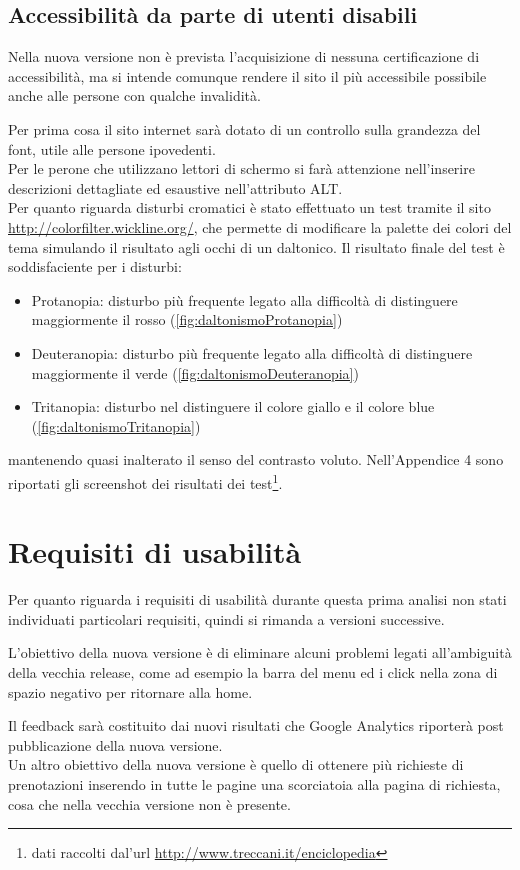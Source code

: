 \documentclass[a4paper,12pt,hidelinks]{report}
\begin{document}
  \subsection{Accessibilità da parte di utenti disabili}
    Nella nuova versione non è prevista l'acquisizione di nessuna certificazione di accessibilità, ma si intende comunque rendere il sito il 
    più accessibile possibile anche alle persone con qualche invalidità.
    \par Per prima cosa il sito internet sarà dotato di un controllo sulla grandezza del font, utile alle persone ipovedenti. 
    \\ Per le perone che utilizzano lettori di schermo si farà attenzione nell'inserire descrizioni dettagliate ed esaustive nell'attributo ALT.
    \\ Per quanto riguarda disturbi cromatici è stato effettuato un test tramite il sito \url{http://colorfilter.wickline.org/}, che permette di modificare 
    la palette dei colori del tema simulando il risultato agli occhi di un daltonico. 
    Il risultato finale del test è soddisfaciente per i disturbi:
    \begin{itemize}
      \item Protanopia: disturbo più frequente legato alla difficoltà di distinguere maggiormente il rosso (\ref{fig:daltonismoProtanopia})
      \item Deuteranopia: disturbo più frequente legato alla difficoltà di distinguere maggiormente il verde (\ref{fig:daltonismoDeuteranopia})
      \item Tritanopia: disturbo nel distinguere il colore giallo e il colore blue (\ref{fig:daltonismoTritanopia})
    \end{itemize}
    mantenendo quasi inalterato il senso del contrasto voluto. Nell'Appendice 4 sono riportati gli screenshot dei risultati dei 
    test\footnote{dati raccolti dal'url \url{http://www.treccani.it/enciclopedia}}.

\section{Requisiti di usabilità}
  Per quanto riguarda i requisiti di usabilità durante questa prima analisi non stati individuati particolari requisiti, quindi si rimanda a versioni successive. 
  \par L'obiettivo della nuova versione è di eliminare alcuni problemi legati all'ambiguità della vecchia release, come ad esempio la barra del menu 
  ed i click nella zona di spazio negativo per ritornare alla home. 
  \par Il feedback sarà costituito dai nuovi risultati che Google Analytics riporterà post pubblicazione della nuova versione.
  \\ Un altro obiettivo della nuova versione è quello di ottenere più richieste di prenotazioni inserendo in tutte le pagine una scorciatoia alla pagina di richiesta,
  cosa che nella vecchia versione non è presente.
\end{document}
